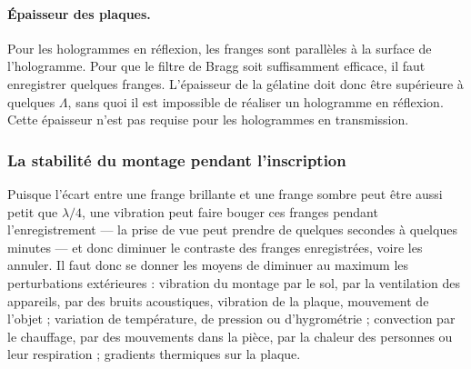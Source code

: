 \begin{figure}[h!]
  \centering
\end{figure}

\paragraph{Épaisseur des plaques.}
Pour les hologrammes en réflexion, les franges sont parallèles à la surface de
l'hologramme. Pour que le filtre de Bragg soit suffisamment efficace, il faut
enregistrer quelques franges. L'épaisseur de la gélatine doit donc être
supérieure à quelques $\Lambda$, sans quoi il est impossible de réaliser un
hologramme en réflexion. Cette épaisseur n'est pas requise pour les hologrammes
en transmission.

\subsubsection{La stabilité du montage pendant l'inscription}
Puisque l'écart entre une frange brillante et une frange sombre peut être aussi
petit que $\lambda/4$, une vibration peut faire bouger ces franges pendant
l'enregistrement --- la prise de vue peut prendre de quelques secondes à
quelques minutes --- et donc diminuer le contraste des franges enregistrées,
voire les annuler. Il faut donc se donner les moyens de diminuer au maximum les
perturbations extérieures : vibration du montage par le sol, par la ventilation
des appareils, par des bruits acoustiques, vibration de la plaque, mouvement de
l'objet ; variation de température, de pression ou d'hygrométrie ; convection
par le chauffage, par des mouvements dans la pièce, par la chaleur des personnes
ou leur respiration ; gradients thermiques sur la plaque.


